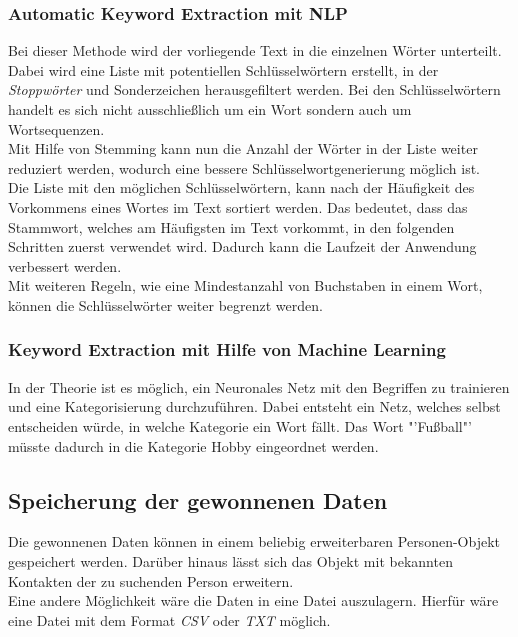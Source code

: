 		\subsubsection{Automatic Keyword Extraction mit NLP}
		\label{sec:Automatic Keyword Extraction}
		Bei dieser Methode wird der vorliegende Text in die einzelnen Wörter unterteilt. Dabei wird eine Liste mit potentiellen Schlüsselwörtern erstellt, in der \textit{Stoppwörter} und Sonderzeichen herausgefiltert werden. Bei den Schlüsselwörtern handelt es sich nicht ausschließlich um ein Wort sondern auch um Wortsequenzen.\\
		Mit Hilfe von Stemming kann nun die Anzahl der Wörter in der Liste weiter reduziert werden, wodurch eine bessere Schlüsselwortgenerierung möglich ist. \\
		Die Liste mit den möglichen Schlüsselwörtern, kann nach der Häufigkeit des Vorkommens eines Wortes im Text sortiert werden. Das bedeutet, dass das Stammwort, welches am Häufigsten im Text vorkommt, in den folgenden Schritten zuerst verwendet wird. Dadurch kann die Laufzeit der Anwendung verbessert werden.\\
		Mit weiteren Regeln, wie eine Mindestanzahl von Buchstaben in einem Wort, können die Schlüsselwörter weiter begrenzt werden. 
				 
		\subsubsection{Keyword Extraction mit Hilfe von Machine Learning}
		\label{sec:KeywordExtractionMachine Learning}
		In der Theorie ist es möglich, ein Neuronales Netz mit den Begriffen zu trainieren und eine Kategorisierung durchzuführen. Dabei entsteht ein Netz, welches selbst entscheiden würde, in welche Kategorie ein Wort fällt. Das Wort "'Fußball"' müsste dadurch in die Kategorie Hobby eingeordnet werden.
	\subsection{Speicherung der gewonnenen Daten}
	Die gewonnenen Daten können in einem beliebig erweiterbaren Personen-Objekt gespeichert werden. Darüber hinaus lässt sich das Objekt mit bekannten Kontakten der zu suchenden Person erweitern.\\
	Eine andere Möglichkeit wäre die Daten in eine Datei auszulagern. Hierfür wäre eine Datei mit dem Format \textit{CSV} oder \textit{TXT} möglich.
	
